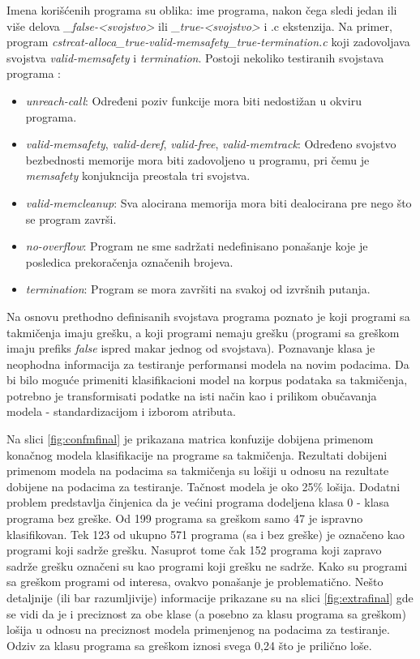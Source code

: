 \documentclass[12pt,oneside]{memoir}
\begin{document}
Imena korišćenih programa su oblika: ime programa, nakon čega sledi jedan ili više delova \textit{\_false-<svojstvo>} ili \textit{\_true-<svojstvo>} i .c ekstenzija. Na primer, program \textit{cstrcat-alloca\_true-valid-memsafety\_true-termination.c} koji zadovoljava svojstva \textit{valid-memsafety} i \textit{termination}. Postoji nekoliko testiranih svojstava programa \cite{benchmarks}:
\begin{itemize}
	\item \textit{unreach-call}: Određeni poziv funkcije mora biti nedostižan u okviru programa.
	\item \textit{valid-memsafety}, \textit{valid-deref}, \textit{valid-free}, \textit{valid-memtrack}: Određeno svojstvo bezbednosti memorije mora biti zadovoljeno u programu, pri čemu je \textit{memsafety} konjukncija preostala tri svojstva.
	\item \textit{valid-memcleanup}: Sva alocirana memorija mora biti dealocirana pre nego što se program završi.
	\item \textit{no-overflow}: Program ne sme sadržati nedefinisano ponašanje koje je posledica prekoračenja označenih brojeva.
	\item \textit{termination}: Program se mora završiti na svakoj od izvršnih putanja.
\end{itemize}

Na osnovu prethodno definisanih svojstava programa poznato je koji programi sa takmičenja imaju grešku, a koji programi nemaju grešku (programi sa greškom imaju prefiks \textit{false} ispred makar jednog od svojstava). Poznavanje klasa je neophodna informacija za testiranje performansi modela na novim podacima. Da bi bilo moguće primeniti klasifikacioni model na korpus podataka sa takmičenja, potrebno je transformisati podatke na isti način kao i prilikom obučavanja modela - standardizacijom i izborom atributa. 

Na slici \ref{fig:confmfinal} je prikazana matrica konfuzije dobijena primenom konačnog modela klasifikacije na programe sa takmičenja. Rezultati dobijeni primenom modela na podacima sa takmičenja su lošiji u odnosu na rezultate dobijene na podacima za testiranje. Tačnost modela je oko 25\% lošija. Dodatni problem predstavlja činjenica da je većini programa dodeljena klasa 0 - klasa programa bez greške. Od 199 programa sa greškom samo 47 je ispravno klasifikovan. Tek 123 od ukupno 571 programa (sa i bez greške) je označeno kao programi koji sadrže grešku. Nasuprot tome čak 152 programa koji zapravo sadrže grešku označeni su kao programi koji grešku ne sadrže. Kako su programi sa greškom programi od interesa, ovakvo ponašanje je problematično. Nešto detaljnije (ili bar razumljivije) informacije prikazane su na slici \ref{fig:extrafinal} gde se vidi da je i preciznost za obe klase (a posebno za klasu programa sa greškom) lošija u odnosu na preciznost modela primenjenog na podacima za testiranje. Odziv za klasu programa sa greškom iznosi svega 0,24 što je prilično loše.
\end{document}
